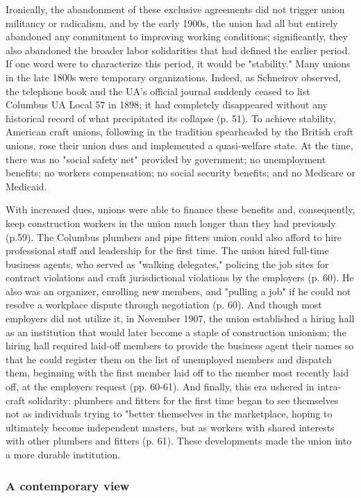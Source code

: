 \documentclass[12pt]{article}
\begin{document}
Ironically, the abandonment of these exclusive agreements did not trigger union militancy or radicalism, and by the early 1900s, the union had all but entirely abandoned any commitment to improving working conditions; significantly, they also abandoned the broader labor solidarities that had defined the earlier period. If one word were to characterize this period, it would be "stability." Many unions in the late 1800s were temporary organizations. Indeed, as Schneirov observed, the telephone book and the UA’s official journal suddenly ceased to list Columbus UA Local 57 in 1898; it had completely disappeared without any historical record of what precipitated its collapse (p. 51). To achieve stability, American craft unions, following in the tradition spearheaded by the British craft unions, rose their union dues and implemented a quasi-welfare state. At the time, there was no "social safety net" provided by government; no unemployment benefits; no workers compensation; no social security benefits; and no Medicare or Medicaid. 

With increased dues, unions were able to finance these benefits and, consequently, keep construction workers in the union much longer than they had previously (p.59). The Columbus plumbers and pipe fitters union could also afford to hire professional staff and leadership for the first time. The union hired full-time business agents, who served as "walking delegates," policing the job sites for contract violations and craft jurisdictional violations by the employers (p. 60). He also was an organizer, enrolling new members, and "pulling a job" if he could not resolve a workplace dispute through negotiation (p. 60). And though most employers did not utilize it, in November 1907, the union established a hiring hall as an institution that would later become a staple of construction unionism; the hiring hall required laid-off members to provide the business agent their names so that he could register them on the list of unemployed members and dispatch them, beginning with the first member laid off to the member most recently laid off, at the employers request (pp. 60-61). And finally, this era ushered in intra-craft solidarity: plumbers and fitters for the first time began to see themselves not as individuals trying to "better themselves in the marketplace, hoping to ultimately become independent masters, but as workers with shared interests with other plumbers and fitters (p. 61). These developments made the union into a more durable institution.

\subsubsection{A contemporary view} \
\end{document}
